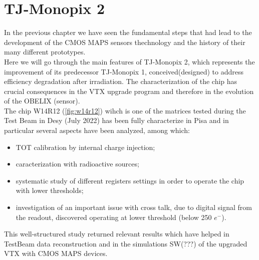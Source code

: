 
\begin{comment}
Normal/Cascode differ only by one transistor designed to increase gain

Voltage step applied trough injection capacitor
\end{comment}


\chapter{TJ-Monopix 2}

In the previous chapter we have seen the fundamental steps that had lead to the development of the CMOS MAPS sensors thechnology and the history of their many different prototypes. \\
Here we will go through the main features of TJ-Monopix 2, which represents the improvement of its predecessor TJ-Monopix 1, conceived(designed) to address efficiency degradation after irradiation. The characterization of the chip has crucial consequences in the VTX upgrade program and therefore in the evolution of the OBELIX (sensor).\\
The chip W14R12 (\vref{fig:w14r12}) wihch is one of the matrices tested during the Test Beam in Desy (July 2022) has been fully characterize in Pisa and in particular several aspects have been analyzed, among which:

\begin{itemize}
\item TOT calibration by internal charge injection;
\item caracterization with radioactive sources;
\item systematic study of different registers settings in order to operate the chip with lower thresholds;
\item investigation of an important issue with cross talk, due to digital signal from the readout, discovered operating at lower threshold (below 250 $e^{-}$).
\end{itemize}

This well-structured study returned relevant results which have helped in TestBeam data reconstruction and in the simulations SW(???) of the upgraded VTX with CMOS MAPS devices.




